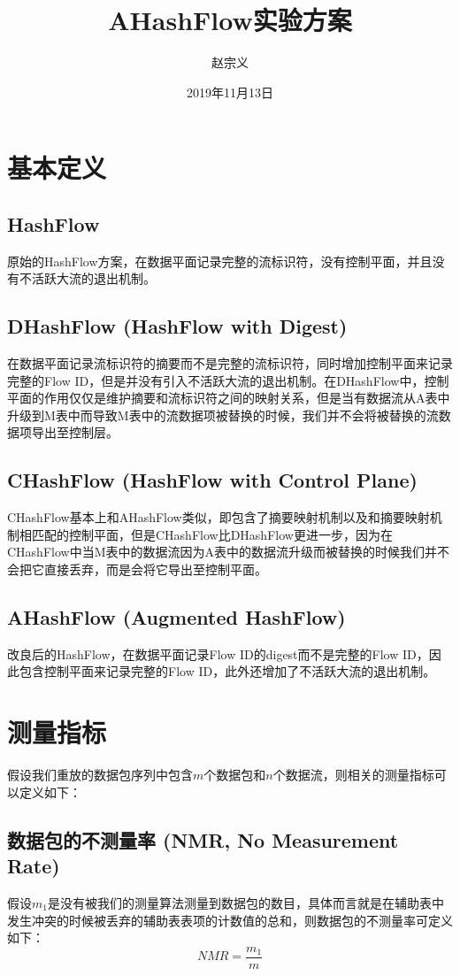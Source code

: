 \documentclass{article}
\title{AHashFlow实验方案}
\author{赵宗义}
\date{2019年11月13日}
\begin{document}
\maketitle

\tableofcontents

\section{基本定义}
\subsection{HashFlow}
原始的HashFlow方案，在数据平面记录完整的流标识符，没有控制平面，并且没有不活跃大流的退出机制。

\subsection{DHashFlow (HashFlow with Digest)}
在数据平面记录流标识符的摘要而不是完整的流标识符，同时增加控制平面来记录完整的Flow ID，但是并没有引入不活跃大流的退出机制。在DHashFlow中，控制平面的作用仅仅是维护摘要和流标识符之间的映射关系，但是当有数据流从A表中升级到M表中而导致M表中的流数据项被替换的时候，我们并不会将被替换的流数据项导出至控制层。

\subsection{CHashFlow (HashFlow with Control Plane)}
CHashFlow基本上和AHashFlow类似，即包含了摘要映射机制以及和摘要映射机制相匹配的控制平面，但是CHashFlow比DHashFlow更进一步，因为在CHashFlow中当M表中的数据流因为A表中的数据流升级而被替换的时候我们并不会把它直接丢弃，而是会将它导出至控制平面。

\subsection{AHashFlow (Augmented HashFlow)}
改良后的HashFlow，在数据平面记录Flow ID的digest而不是完整的Flow ID，因此包含控制平面来记录完整的Flow ID，此外还增加了不活跃大流的退出机制。

\section{测量指标}
假设我们重放的数据包序列中包含$m$个数据包和$n$个数据流，则相关的测量指标可以定义如下：

\subsection{数据包的不测量率  (NMR, No Measurement Rate)}
假设$m_1$是没有被我们的测量算法测量到数据包的数目，具体而言就是在辅助表中发生冲突的时候被丢弃的辅助表表项的计数值的总和，则数据包的不测量率可定义如下：
$$
NMR = \frac{m_1}{m}
$$
\end{document}
